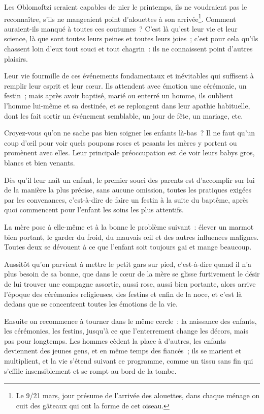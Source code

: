 \documentclass[french,twoside]{book} %
\begin{document}
Les Oblomoftzi seraient capables de nier le printemps, ils ne voudraient pas le reconnaître, s’ils ne mangeaient point d’alouettes à son arrivée\footnote{Le 9/21 mars, jour présume de l’arrivée des alouettes, dans chaque ménage on cuit des gâteaux qui ont la forme de cet oiseau.}. Comment auraient-ils manqué à toutes ces coutumes ? C’est là qu’est leur vie et leur science, là que sont toutes leurs peines et toutes leurs joies ; c’est pour cela qu’ils chassent loin d’eux tout souci et tout chagrin : ils ne connaissent point d’autres plaisirs.\par
Leur vie fourmille de ces événements fondamentaux et inévitables qui suffisent à remplir leur esprit et leur cœur. Ils attendent avec émotion une cérémonie, un festin ; mais après avoir baptisé, marié ou enterré un homme, ils oublient l’homme lui-même et sa destinée, et se replongent dans leur apathie habituelle, dont les fait sortir un événement semblable, un jour de fête, un mariage, etc.\par
Croyez-vous qu’on ne sache pas bien soigner les enfants là-bas ? Il ne faut qu’un coup d’œil pour voir quels poupons roses et pesants les mères y portent ou promènent avec elles. Leur principale préoccupation est de voir leurs babys gros, blancs et bien venants.\par
Dès qu’il leur naît un enfant, le premier souci des parents est d’accomplir sur lui de la manière la plus précise, sans aucune omission, toutes les pratiques exigées par les convenances, c’est-à-dire de faire un festin à la suite du baptême, après quoi commencent pour l’enfant les soins les plus attentifs.\par
La mère pose à elle-même et à la bonne le problème suivant : élever un marmot bien portant, le garder du froid, du mauvais œil et des autres influences malignes. Toutes deux se dévouent à ce que l’enfant soit toujours gai et mange beaucoup.\par
Aussitôt qu’on parvient à mettre le petit gars sur pied, c’est-à-dire quand il n’a plus besoin de sa bonne, que dans le cœur de la mère se glisse furtivement le désir de lui trouver une compagne assortie, aussi rose, aussi bien portante, alors arrive l’époque des cérémonies religieuses, des festins et enfin de la noce, et c’est là dedans que se concentrent toutes les émotions de la vie.\par
Ensuite on recommence à tourner dans le même cercle : la naissance des enfants, les cérémonies, les festins, jusqu’à ce que l’enterrement change les décors, mais pas pour longtemps. Les hommes cèdent la place à d’autres, les enfants deviennent des jeunes gens, et en même temps des fiancés ; ils se marient et multiplient, et la vie s’étend suivant ce programme, comme un tissu sans fin qui s’effile insensiblement et se rompt au bord de la tombe.\par
\end{document}
